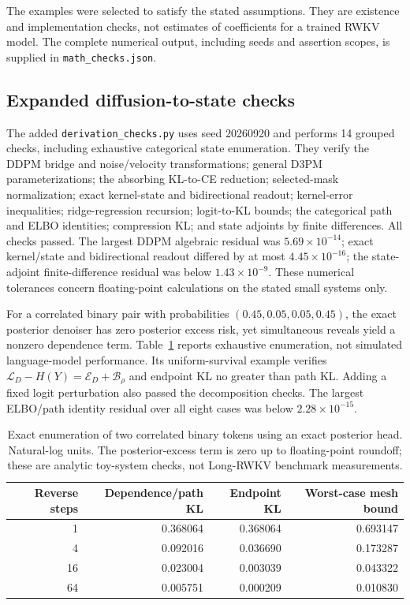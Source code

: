 \documentclass{article}
\theoremstyle{remark}\newtheorem{remark}[theorem]{Remark}
\begin{document}
The examples were selected to satisfy the stated assumptions. They are existence and implementation checks, not estimates of coefficients for a trained RWKV model. The complete numerical output, including seeds and assertion scopes, is supplied in \texttt{math\_checks.json}.


\subsection{Expanded diffusion-to-state checks}
The added \texttt{derivation\_checks.py} uses seed 20260920 and performs 14 grouped checks, including exhaustive categorical state enumeration. They verify the DDPM bridge and noise/velocity transformations; general D3PM parameterizations; the absorbing KL-to-CE reduction; selected-mask normalization; exact kernel-state and bidirectional readout; kernel-error inequalities; ridge-regression recursion; logit-to-KL bounds; the categorical path and ELBO identities; compression KL; and state adjoints by finite differences. All checks passed. The largest DDPM algebraic residual was $5.69\times10^{-14}$; exact kernel/state and bidirectional readout differed by at most $4.45\times10^{-16}$; the state-adjoint finite-difference residual was below $1.43\times10^{-9}$. These numerical tolerances concern floating-point calculations on the stated small systems only.

For a correlated binary pair with probabilities $(0.45,0.05,0.05,0.45)$, the exact posterior denoiser has zero posterior excess risk, yet simultaneous reveals yield a nonzero dependence term. Table~\ref{tab:newchecks} reports exhaustive enumeration, not simulated language-model performance. Its uniform-survival example verifies
$\mathcal L_D-H(Y)=\mathcal E_D+\mathcal B_\rho$ and endpoint KL no greater than path KL. Adding a fixed logit perturbation also passed the decomposition checks. The largest ELBO/path identity residual over all eight cases was below $2.28\times10^{-15}$.

\begin{table}[htbp]
\centering\small
\caption{Exact enumeration of two correlated binary tokens using an exact posterior head. Natural-log units. The posterior-excess term is zero up to floating-point roundoff; these are analytic toy-system checks, not Long-RWKV benchmark measurements.}
\label{tab:newchecks}
\begin{tabular}{@{}rrrr@{}}
\toprule
Reverse steps & Dependence/path KL & Endpoint KL & Worst-case mesh bound\\
\midrule
1 & 0.368064 & 0.368064 & 0.693147\\
4 & 0.092016 & 0.036690 & 0.173287\\
16 & 0.023004 & 0.003039 & 0.043322\\
64 & 0.005751 & 0.000209 & 0.010830\\
\bottomrule
\end{tabular}
\end{table}
\end{document}
